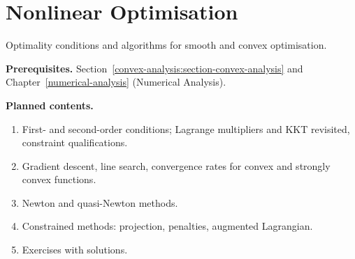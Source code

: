 \section{Nonlinear Optimisation}\label{convex-analysis:section-nonlinear-optimisation}
Optimality conditions and algorithms for smooth and convex optimisation.

\noindent\textbf{Prerequisites.} Section~\ref{convex-analysis:section-convex-analysis} and Chapter~\ref{numerical-analysis} (Numerical Analysis).

\noindent\textbf{Planned contents.}
\begin{enumerate}
\item First- and second-order conditions; Lagrange multipliers and KKT revisited, constraint qualifications.
\item Gradient descent, line search, convergence rates for convex and strongly convex functions.
\item Newton and quasi-Newton methods.
\item Constrained methods: projection, penalties, augmented Lagrangian.
\item Exercises with solutions.
\end{enumerate}
